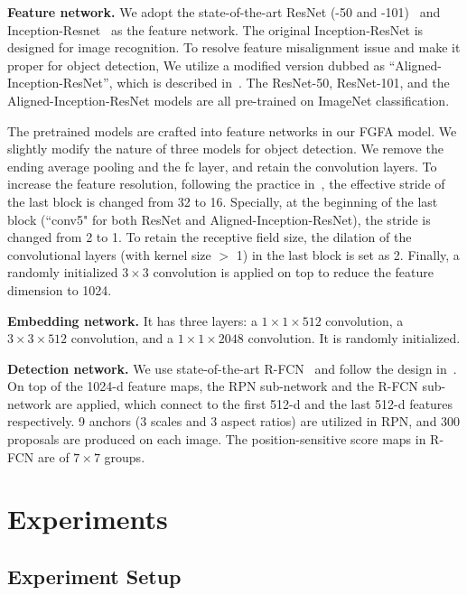 \documentclass[10pt,twocolumn,letterpaper]{article}
\begin{document}
\textbf{Feature network.} We adopt the state-of-the-art ResNet (-50 and -101)~\cite{he2016deep} and Inception-Resnet~\cite{szegedy2016inception} as the feature network. The original Inception-ResNet is designed for image recognition. To resolve feature misalignment issue and make it proper for object detection, We utilize a modified version dubbed as ``Aligned-Inception-ResNet'', which is described in~\cite{dai2017deformable}. The ResNet-50, ResNet-101, and the Aligned-Inception-ResNet models are all pre-trained on ImageNet classification.

The pretrained models are crafted into feature networks in our FGFA model. We slightly modify the nature of three models for object detection. We remove the ending average pooling and the fc layer, and retain the convolution layers. To increase the feature resolution, following the practice in~\cite{chen2014semantic,dai2016rfcn}, the effective stride of the last block is changed from 32 to 16. Specially, at the beginning of the last block (``conv5" for both ResNet and Aligned-Inception-ResNet), the stride is changed from 2 to 1. To retain the receptive field size, the dilation of the convolutional layers (with kernel size $>$ 1) in the last block is set as 2. Finally, a randomly initialized $3 \times 3$ convolution is applied on top to reduce the feature dimension to 1024.

\textbf{Embedding network.} It has three layers: a $1 \times 1 \times 512$ convolution, a $3 \times 3 \times 512$ convolution, and a $1 \times 1 \times 2048$ convolution. It is randomly initialized.

\textbf{Detection network.} We use state-of-the-art R-FCN~\cite{dai2016rfcn} and follow the design in~\cite{zhu2016dff}. On top of the 1024-d feature maps, the RPN sub-network and the R-FCN sub-network are applied, which connect to the first 512-d and the last 512-d features respectively.  9 anchors (3 scales and 3 aspect ratios) are utilized in RPN, and 300 proposals are produced on each image. The position-sensitive score maps in R-FCN are of $7 \times 7$ groups.


\section{Experiments}

\subsection{Experiment Setup}
\end{document}
